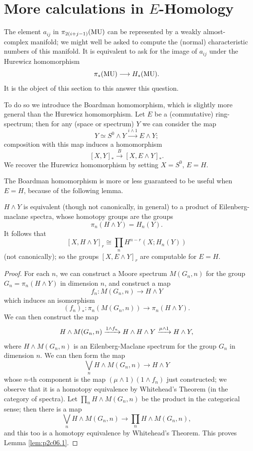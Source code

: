 \documentclass[../main]{subfiles}
\begin{document}
\renewcommand{\labelenumi}{(\roman{enumi})}

\chapter{More calculations in \texorpdfstring{$E$}{E}-Homology}
\label{sec:p2c6}
The element $a_{ij}$ in $\pi_{2(i+j-1)}(\mathrm{MU})$ can be represented by a weakly almost-complex manifold; we might well be asked to compute the (normal) characteristic numbers of this manifold. It is equivalent to ask for the image of $a_{ij}$ under the Hurewicz homomorphism
\[\pi_\ast(\mathrm{MU})\longrightarrow H_\ast(\mathrm{MU}).\]
It is the object of this section to this answer this question.

To do so we introduce the Boardman homomorphism, which is slightly more general than the Hurewicz homomorphism. Let $E$ be a (commutative) ring-spectrum; then for any (space or spectrum) $Y$ we can consider the map 
\[Y\simeq S^0\wedge Y\overset{i\wedge 1}{\longrightarrow} E\wedge Y;\]
composition with this map induces a homomorphism 
\[[X,Y]_\ast\overset{B}{\longrightarrow}[X,E\wedge Y]_\ast.\]
We recover the Hurewicz homomorphism by setting $X=S^0$, $E=H$. 

The Boardman homomorphism is more or less guaranteed to be useful when $E=H$, because of the following lemma.
\begin{lemma}
\label{lem:p2c06.1}
$H\wedge Y$ is equivalent (though not canonically, in general) to a product of Eilenberg-maclane spectra, whose homotopy groups are the groups
\[\pi_n(H\wedge Y)=H_n(Y).\]
It follows that 
\[[X,H\wedge Y]_r \cong \prod_n H^{n-r}(X;H_n(Y))\]
(not canonically); so the groups $[X,E\wedge Y]_r$ are computable for $E=H$.
\end{lemma}
\begin{proof}
For each $n$, we can construct a Moore spectrum $M(G_n,n)$ for the group $G_n=\pi_n(H\wedge Y)$ in dimension $n$, and construct a map 
\[f_n:M(G_n,n)\longrightarrow H\wedge Y\]
which induces an isomorphism
\[(f_n)_\ast:\pi_n(M(G_n,n))\longrightarrow \pi_n(H\wedge Y).\]
We can then construct the map
\[H\wedge M(G_n,n)\vra{1\wedge f_n} H\wedge H\wedge Y \vra{\mu\wedge 1} H\wedge Y,\]
where $H\wedge M(G_n,n)$ is an Eilenberg-Maclane spectrum for the group $G_n$ in dimension $n$. We can then form the map
\[\bigvee_n H\wedge M(G_n,n)\longrightarrow H\wedge Y\]
whose $n$-th component is the map $(\mu\wedge 1)(1\wedge f_n)$ just constructed; we observe that it is a homotopy equivalence by Whitehead's Theorem (in the category of spectra). Let $\prod_n H\wedge M(G_n,n)$ be the product in the categorical sense; then there is a map 
\[\bigvee_n H\wedge M(G_n,n)\longrightarrow \prod_n H\wedge M(G_n,n),\]
and this too is a homotopy equivalence by Whitehead's Theorem. This proves Lemma \ref{lem:p2c06.1}.
\end{proof}
\end{document}
